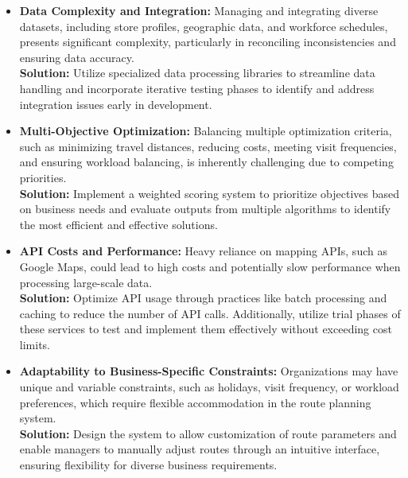 \begin{itemize}
    \item \textbf{Data Complexity and Integration:} Managing and integrating diverse datasets, including store profiles, geographic data, and workforce schedules, presents significant complexity, particularly in reconciling inconsistencies and ensuring data accuracy. \\
    \textbf{Solution:} Utilize specialized data processing libraries to streamline data handling and incorporate iterative testing phases to identify and address integration issues early in development.

    \item \textbf{Multi-Objective Optimization:} Balancing multiple optimization criteria, such as minimizing travel distances, reducing costs, meeting visit frequencies, and ensuring workload balancing, is inherently challenging due to competing priorities. \\
    \textbf{Solution:} Implement a weighted scoring system to prioritize objectives based on business needs and evaluate outputs from multiple algorithms to identify the most efficient and effective solutions.

    \item \textbf{API Costs and Performance:} Heavy reliance on mapping APIs, such as Google Maps, could lead to high costs and potentially slow performance when processing large-scale data. \\
    \textbf{Solution:} Optimize API usage through practices like batch processing and caching to reduce the number of API calls. Additionally, utilize trial phases of these services to test and implement them effectively without exceeding cost limits.

    \item \textbf{Adaptability to Business-Specific Constraints:} Organizations may have unique and variable constraints, such as holidays, visit frequency, or workload preferences, which require flexible accommodation in the route planning system. \\
    \textbf{Solution:} Design the system to allow customization of route parameters and enable managers to manually adjust routes through an intuitive interface, ensuring flexibility for diverse business requirements.


\end{itemize}

